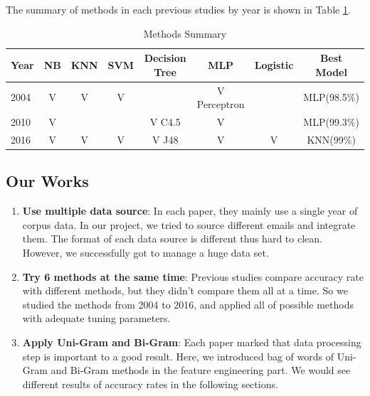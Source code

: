 The summary of methods in each previous studies by year is shown in Table \ref{method_summary}. 

\begin{table}[H]
	\centering
	\caption{Methods Summary}
	\label{method_summary}
	\begin{tabular}{lcccccc||c}
		\hline
		Year & NB & KNN   & SVM  & Decision Tree & MLP & Logistic & Best Model  \\ \hline
		2004\cite{MLinspam} &  V &  V    & V     &  \quad  & V Perceptron & \quad& MLP(98.5\%) \\
		2010\cite{EmailMLT} &  V & \quad & \quad & V C4.5  & V            & \quad& MLP(99.3\%) \\ 
		2016\cite{MailDectionCL} &  V &    V  & V     & V  J48  &   V & V      & KNN(99\%)  \\ \hline
	\end{tabular}
\end{table}





\subsection{Our Works}

\begin{enumerate}
	\item \textbf{Use multiple data source}: In each paper, they mainly use a single year of corpus data. In our project, we tried to source different emails and integrate them. The format of each data source is different thus hard to clean. However, we successfully got to manage a huge data set. 

	\item \textbf{Try 6 methods at the same time}: Previous studies compare accuracy rate with different methods, but they didn't compare them all at a time. So we studied the methods from 2004 to 2016, and applied all of possible methods with adequate tuning parameters.

	\item \textbf{Apply Uni-Gram and Bi-Gram}: Each paper marked that data processing step is important to a good result. Here, we introduced bag of words of Uni-Gram and Bi-Gram methods in the feature engineering part. We would see different results of accuracy rates in the following sections.
\end{enumerate}
